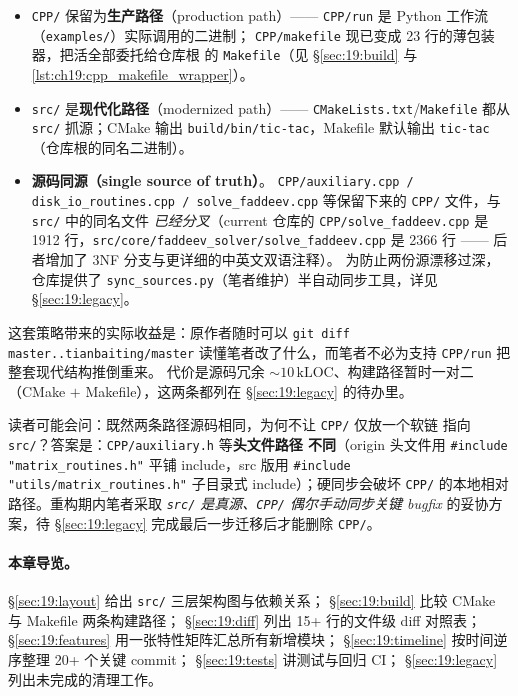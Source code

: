 \begin{itemize}
\item \texttt{CPP/} 保留为\textbf{生产路径}（production path）——
      \texttt{CPP/run} 是 Python 工作流（\texttt{examples/}）实际调用的二进制；
      \texttt{CPP/makefile} 现已变成 23 行的薄包装器，把活全部委托给仓库根
      的 \texttt{Makefile}（见 §\ref{sec:19:build} 与 \cref{lst:ch19:cpp_makefile_wrapper}）。
\item \texttt{src/} 是\textbf{现代化路径}（modernized path）——
      \texttt{CMakeLists.txt}/\texttt{Makefile} 都从 \texttt{src/}
      抓源；CMake 输出 \texttt{build/bin/tic-tac}，Makefile 默认输出
      \texttt{tic-tac}（仓库根的同名二进制）。
\item \textbf{源码同源（single source of truth）}。
      \texttt{CPP/auxiliary.cpp / disk\_io\_routines.cpp / solve\_faddeev.cpp}
      等保留下来的 \texttt{CPP/} 文件，与 \texttt{src/} 中的同名文件
      \emph{已经分叉}（current 仓库的 \texttt{CPP/solve\_faddeev.cpp} 是
      1912 行，\texttt{src/core/faddeev\_solver/solve\_faddeev.cpp} 是 2366 行
      —— 后者增加了 3NF 分支与更详细的中英文双语注释）。
      为防止两份源漂移过深，仓库提供了
      \texttt{sync\_sources.py}（笔者维护）半自动同步工具，详见
      §\ref{sec:19:legacy}。
\end{itemize}

这套策略带来的实际收益是：原作者随时可以 \texttt{git diff master..tianbaiting/master}
读懂笔者改了什么，而笔者不必为支持 \texttt{CPP/run} 把整套现代结构推倒重来。
代价是源码冗余 ${\sim}10\,\text{kLOC}$、构建路径暂时一对二（CMake $+$
Makefile），这两条都列在 §\ref{sec:19:legacy} 的待办里。

\begin{remark}
读者可能会问：既然两条路径源码相同，为何不让 \texttt{CPP/} 仅放一个软链
指向 \texttt{src/}？答案是：\texttt{CPP/auxiliary.h} 等\textbf{头文件路径
不同}（origin 头文件用 \texttt{\#include "matrix\_routines.h"} 平铺
include，src 版用 \texttt{\#include "utils/matrix\_routines.h"} 子目录式
include）；硬同步会破坏 \texttt{CPP/} 的本地相对路径。重构期内笔者采取
\emph{\texttt{src/} 是真源、\texttt{CPP/} 偶尔手动同步关键 bugfix}
的妥协方案，待 §\ref{sec:19:legacy} 完成最后一步迁移后才能删除 \texttt{CPP/}。
\end{remark}

\paragraph{本章导览。}
%
§\ref{sec:19:layout} 给出 \texttt{src/} 三层架构图与依赖关系；
§\ref{sec:19:build} 比较 CMake 与 Makefile 两条构建路径；
§\ref{sec:19:diff} 列出 15+ 行的文件级 diff 对照表；
§\ref{sec:19:features} 用一张特性矩阵汇总所有新增模块；
§\ref{sec:19:timeline} 按时间逆序整理 20+ 个关键 commit；
§\ref{sec:19:tests} 讲测试与回归 CI；
§\ref{sec:19:legacy} 列出未完成的清理工作。

